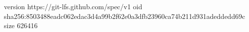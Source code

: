 version https://git-lfs.github.com/spec/v1
oid sha256:8503488eadc062edac3d4a99b2f62e0a3dfb23960ca74b211d931adeddedd69c
size 626416
